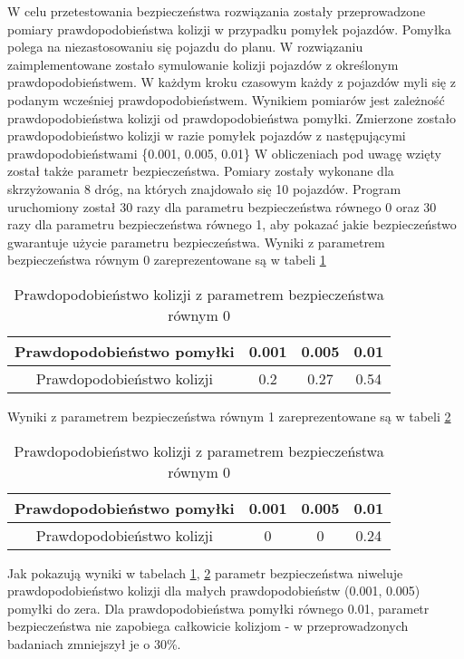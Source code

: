 W celu przetestowania bezpieczeństwa rozwiązania zostały przeprowadzone pomiary prawdopodobieństwa kolizji w przypadku pomyłek pojazdów. Pomyłka polega na niezastosowaniu się pojazdu do planu. W rozwiązaniu zaimplementowane zostało symulowanie kolizji pojazdów z określonym prawdopodobieństwem. W każdym kroku czasowym każdy z pojazdów myli się z podanym wcześniej prawdopodobieństwem. Wynikiem pomiarów jest zależność prawdopodobieństwa kolizji od prawdopodobieństwa pomyłki. Zmierzone zostało prawdopodobieństwo kolizji w razie pomyłek pojazdów z następującymi prawdopodobieństwami \{0.001, 0.005, 0.01\}
\newline
\indent
W obliczeniach pod uwagę wzięty został także parametr bezpieczeństwa. Pomiary zostały wykonane dla skrzyżowania 8 dróg, na których znajdowało się 10 pojazdów. Program uruchomiony został 30 razy dla parametru bezpieczeństwa równego 0 oraz 30 razy dla parametru bezpieczeństwa równego 1, aby pokazać jakie bezpieczeństwo gwarantuje użycie parametru bezpieczeństwa.
\newline
\newline
Wyniki z parametrem bezpieczeństwa równym 0 zareprezentowane są w tabeli \ref{firstCollision}
\begin{table}[H]
    \centering
    \begin{tabular}{|c|c|c|c|}
      \hline 
      Prawdopodobieństwo pomyłki & 0.001 & 0.005 & 0.01 \\
      \hline
      Prawdopodobieństwo kolizji & 0.2 & 0.27 & 0.54 \\
      \hline
    \end{tabular} 
    \caption{Prawdopodobieństwo kolizji z parametrem bezpieczeństwa równym 0}
    \label{firstCollision}
\end{table}
\noindent
Wyniki z parametrem bezpieczeństwa równym 1 zareprezentowane są w tabeli \ref{secondCollision}
\begin{table}[H]
    \centering
    \begin{tabular}{|c|c|c|c|}
      \hline 
      Prawdopodobieństwo pomyłki & 0.001 & 0.005 & 0.01 \\
      \hline
      Prawdopodobieństwo kolizji & 0 & 0 & 0.24 \\
      \hline
    \end{tabular} 
    \caption{Prawdopodobieństwo kolizji z parametrem bezpieczeństwa równym 0}
    \label{secondCollision}
\end{table}
Jak pokazują wyniki w tabelach \ref{firstCollision}, \ref{secondCollision} parametr bezpieczeństwa niweluje prawdopodobieństwo kolizji dla małych prawdopodobieństw (0.001, 0.005) pomyłki do zera. Dla prawdopodobieństwa pomyłki równego 0.01, parametr bezpieczeństwa nie zapobiega całkowicie kolizjom - w przeprowadzonych badaniach zmniejszył je o 30\%.

